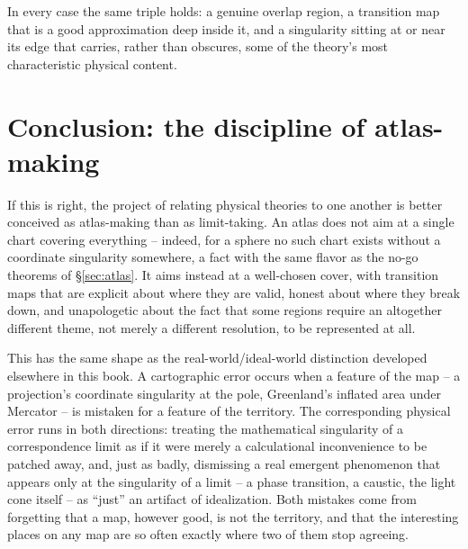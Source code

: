 In every case the same triple holds: a genuine overlap region, a transition map that is a good approximation deep inside it, and a singularity sitting at or near its edge that carries, rather than obscures, some of the theory's most characteristic physical content.

\section{Conclusion: the discipline of atlas-making}
\label{sec:conclusion}

If this is right, the project of relating physical theories to one another is better conceived as atlas-making than as limit-taking. An atlas does not aim at a single chart covering everything -- indeed, for a sphere no such chart exists without a coordinate singularity somewhere, a fact with the same flavor as the no-go theorems of \S\ref{sec:atlas}. It aims instead at a well-chosen cover, with transition maps that are explicit about where they are valid, honest about where they break down, and unapologetic about the fact that some regions require an altogether different theme, not merely a different resolution, to be represented at all.

This has the same shape as the real-world/ideal-world distinction developed elsewhere in this book. A cartographic error occurs when a feature of the map -- a projection's coordinate singularity at the pole, Greenland's inflated area under Mercator -- is mistaken for a feature of the territory. The corresponding physical error runs in both directions: treating the mathematical singularity of a correspondence limit as if it were merely a calculational inconvenience to be patched away, and, just as badly, dismissing a real emergent phenomenon that appears only at the singularity of a limit -- a phase transition, a caustic, the light cone itself -- as ``just'' an artifact of idealization. Both mistakes come from forgetting that a map, however good, is not the territory, and that the interesting places on any map are so often exactly where two of them stop agreeing.

